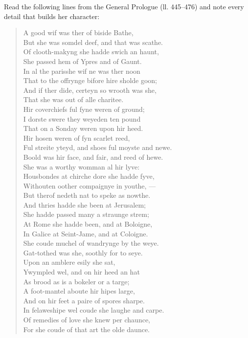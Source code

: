 \documentclass[11pt]{article}
\begin{document}
\begin{experience}
Read the following lines from the General Prologue (ll. 445–476) and note every detail that builds her character:
\begin{quote}
A good wif was ther of biside Bathe, \\
But she was somdel deef, and that was scathe. \\
Of clooth-makyng she hadde swich an haunt, \\
She passed hem of Ypres and of Gaunt. \\
In al the parisshe wif ne was ther noon \\
That to the offrynge bifore hire sholde goon; \\
And if ther dide, certeyn so wrooth was she, \\
That she was out of alle charitee. \\
Hir coverchiefs ful fyne weren of ground; \\
I dorste swere they weyeden ten pound \\
That on a Sonday weren upon hir heed. \\
Hir hosen weren of fyn scarlet reed, \\
Ful streite yteyd, and shoes ful moyste and newe. \\
Boold was hir face, and fair, and reed of hewe. \\
She was a worthy womman al hir lyve: \\
Housbondes at chirche dore she hadde fyve, \\
Withouten oother compaignye in youthe, — \\
But therof nedeth nat to speke as nowthe. \\
And thries hadde she been at Jerusalem; \\
She hadde passed many a straunge strem; \\
At Rome she hadde been, and at Boloigne, \\
In Galice at Seint-Jame, and at Coloigne. \\
She coude muchel of wandrynge by the weye. \\
Gat-tothed was she, soothly for to seye. \\
Upon an amblere esily she sat, \\
Ywympled wel, and on hir heed an hat \\
As brood as is a bokeler or a targe; \\
A foot-mantel aboute hir hipes large, \\
And on hir feet a paire of spores sharpe. \\
In felaweshipe wel coude she laughe and carpe. \\
Of remedies of love she knew per chaunce, \\
For she coude of that art the olde daunce.
\end{quote}
\end{experience}
\end{document}
